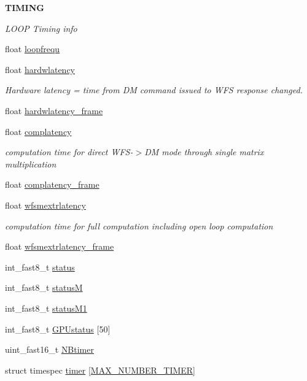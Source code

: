 \begin{Indent}{\bf T\+I\+M\+I\+N\+G}\par
{\em L\+O\+O\+P Timing info }\begin{DoxyCompactItemize}
\item 
float \hyperlink{structAOLOOPCONTROL__CONF_a506f80967bf851d09a3c7a3142666863}{loopfrequ}
\item 
float \hyperlink{structAOLOOPCONTROL__CONF_a1d40ece00af0d1437375d02ee683f55e}{hardwlatency}
\begin{DoxyCompactList}\small\item\em Hardware latency = time from D\+M command issued to W\+F\+S response changed. \end{DoxyCompactList}\item 
float \hyperlink{structAOLOOPCONTROL__CONF_a55a0525bf200253c672802bdcd6675b4}{hardwlatency\+\_\+frame}
\item 
float \hyperlink{structAOLOOPCONTROL__CONF_a97135adf1c43dc479c51a6555c7628ad}{complatency}
\begin{DoxyCompactList}\small\item\em computation time for direct W\+F\+S-\/$>$D\+M mode through single matrix multiplication \end{DoxyCompactList}\item 
float \hyperlink{structAOLOOPCONTROL__CONF_a1e709621de360a72bb4b1a13157c7ada}{complatency\+\_\+frame}
\item 
float \hyperlink{structAOLOOPCONTROL__CONF_a0f5baf85f4a476afc05eb5d7805a7edb}{wfsmextrlatency}
\begin{DoxyCompactList}\small\item\em computation time for full computation including open loop computation \end{DoxyCompactList}\item 
float \hyperlink{structAOLOOPCONTROL__CONF_a759d0a70398b08c8cdc3004c39cfdc86}{wfsmextrlatency\+\_\+frame}
\item 
int\+\_\+fast8\+\_\+t \hyperlink{structAOLOOPCONTROL__CONF_aed2640b4b1ea272fbeb6c69d576d49a4}{status}
\item 
int\+\_\+fast8\+\_\+t \hyperlink{structAOLOOPCONTROL__CONF_a0eff4c6f28292bceefc3b407ef598133}{status\+M}
\item 
int\+\_\+fast8\+\_\+t \hyperlink{structAOLOOPCONTROL__CONF_aa86222ff4de50fdced6524e09e538a25}{status\+M1}
\item 
int\+\_\+fast8\+\_\+t \hyperlink{structAOLOOPCONTROL__CONF_a9cc9387bcd4e897006b66003ed9fcc53}{G\+P\+Ustatus} \mbox{[}50\mbox{]}
\item 
uint\+\_\+fast16\+\_\+t \hyperlink{structAOLOOPCONTROL__CONF_a56ca79cfd9d34d2895d3a2137aa6c8b1}{N\+Btimer}
\item 
struct timespec \hyperlink{structAOLOOPCONTROL__CONF_a31d203062966dd022437a7248d7967a3}{timer} \mbox{[}\hyperlink{AOloopControl_8h_a545b173d2890751a42402351faf60149}{M\+A\+X\+\_\+\+N\+U\+M\+B\+E\+R\+\_\+\+T\+I\+M\+E\+R}\mbox{]}
\end{DoxyCompactItemize}
\end{Indent}
